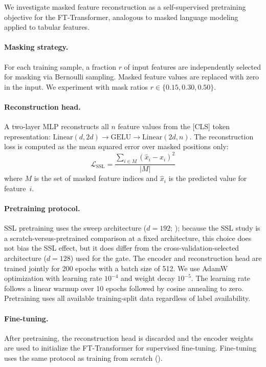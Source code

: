 We investigate masked feature reconstruction as a self-supervised pretraining objective for the FT-Transformer, analogous to masked language modeling \citep{devlin2019bert} applied to tabular features.

\paragraph{Masking strategy.} For each training sample, a fraction $r$ of input features are independently selected for masking via Bernoulli sampling. Masked feature values are replaced with zero in the input. We experiment with mask ratios $r \in \{0.15, 0.30, 0.50\}$.

\paragraph{Reconstruction head.} A two-layer MLP reconstructs all $n$ feature values from the \textsc{[CLS]} token representation: $\text{Linear}(d, 2d) \rightarrow \text{GELU} \rightarrow \text{Linear}(2d, n)$. The reconstruction loss is computed as the mean squared error over masked positions only:
\begin{equation}
  \mathcal{L}_{\text{SSL}} = \frac{\sum_{i \in M} (\hat{x}_i - x_i)^2}{|M|}
  \label{eq:ssl_loss}
\end{equation}
where $M$ is the set of masked feature indices and $\hat{x}_i$ is the predicted value for feature~$i$.

\paragraph{Pretraining protocol.} SSL pretraining uses the sweep architecture ($d = 192$; ); because the SSL study is a scratch-versus-pretrained comparison at a fixed architecture, this choice does not bias the SSL effect, but it does differ from the cross-validation-selected architecture ($d = 128$) used for the gate. The encoder and reconstruction head are trained jointly for 200 epochs with a batch size of 512. We use AdamW optimization with learning rate $10^{-4}$ and weight decay $10^{-5}$. The learning rate follows a linear warmup over 10 epochs followed by cosine annealing to zero. Pretraining uses all available training-split data regardless of label availability.

\paragraph{Fine-tuning.} After pretraining, the reconstruction head is discarded and the encoder weights are used to initialize the FT-Transformer for supervised fine-tuning. Fine-tuning uses the same protocol as training from scratch ().

